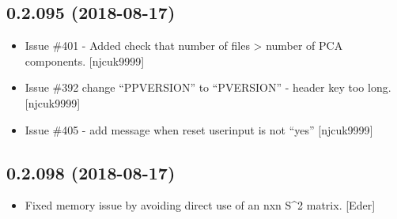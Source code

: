 \documentclass[a4paper,10pt,english]{report}
\begin{document}
\subsection{0.2.095 (2018-08-17)}
\label{\detokenize{misc/changelog:id365}}\begin{itemize}
\item {} 
Issue \#401 - Added check that number of  files \textgreater{} number of
PCA components. {[}njcuk9999{]}

\item {} 
Issue \#392 change “PPVERSION” to “PVERSION” - header key too long.
{[}njcuk9999{]}

\item {} 
Issue \#405 - add message when reset userinput is not “yes” {[}njcuk9999{]}

\end{itemize}


\subsection{0.2.098 (2018-08-17)}
\label{\detokenize{misc/changelog:id366}}\begin{itemize}
\item {} 
Fixed memory issue by avoiding direct use of an nxn S\textasciicircum{}2 matrix. {[}Eder{]}

\end{itemize}
\end{document}
